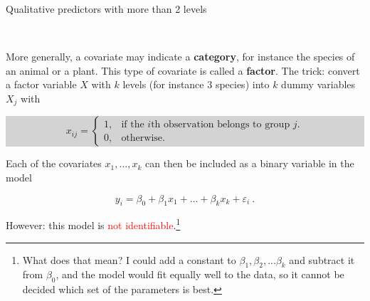 \documentclass[10pt,ignorenonframetext,]{beamer}
\begin{document}
\begin{frame}

\begin{block}{Qualitative predictors with more than 2 levels}

\(~\)

More generally, a covariate may indicate a \textbf{category}, for
instance the species of an animal or a plant. This type of covariate is
called a \textbf{factor}. The trick: convert a factor variable \(X\)
with \(k\) levels (for instance 3 species) into \(k\) dummy variables
\(X_j\) with \vspace{2mm}

\colorbox{lightgray}{\begin{minipage}{10cm}
\vspace{-0mm}
\begin{equation*}
x_{ij} = \left\{ 
\begin{array} {ll}
1, & \text{if the $i$th observation belongs to group $j$}.\\
0, & \text{otherwise.}
\end{array}\right.
\end{equation*}
\end{minipage}}

\vspace{4mm}

Each of the covariates \(x_1,\ldots, x_k\) can then be included as a
binary variable in the model

\begin{equation*}
y_i = \beta_0 + \beta_1 x_1 + \ldots + \beta_k x_k + \varepsilon_i \ .
\end{equation*}

\vspace{6mm} However: this model is
\textcolor{red}{not identifiable}.\footnote{What does that mean? I could add a constant to $\beta_1, \beta_2, ...\beta_k$ and subtract it from $\beta_0$, and the model would fit equally well to the data, so it cannot be decided which set of the parameters is best.}

\end{block}

\end{frame}
\end{document}
